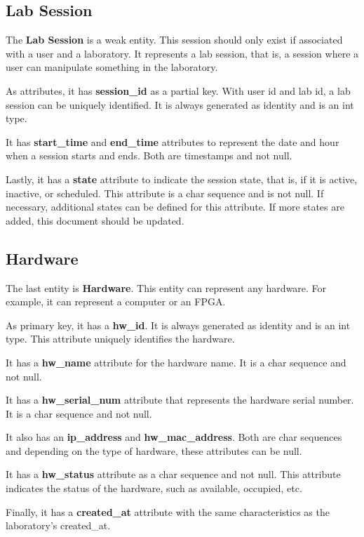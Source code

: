 \documentclass[a4paper,twoside,11pt]{article}
\begin{document}
\subsection*{Lab Session}
The \textbf{Lab Session} is a weak entity. This session should only exist if associated with a user and a laboratory. It represents a lab session, that is, a session where a user can manipulate something in the laboratory.

As attributes, it has \textbf{session\_id} as a partial key. With user id and lab id, a lab session can be uniquely identified. It is always generated as identity and is an int type.

It has \textbf{start\_time} and \textbf{end\_time} attributes to represent the date and hour when a session starts and ends. Both are timestamps and not null.

Lastly, it has a \textbf{state} attribute to indicate the session state, that is, if it is active, inactive, or scheduled. This attribute is a char sequence and is not null. If necessary, additional states can be defined for this attribute. If more states are added, this document should be updated.

\subsection*{Hardware}
The last entity is \textbf{Hardware}. This entity can represent any hardware. For example, it can represent a computer or an FPGA.

As primary key, it has a \textbf{hw\_id}. It is always generated as identity and is an int type. This attribute uniquely identifies the hardware.

It has a \textbf{hw\_name} attribute for the hardware name. It is a char sequence and not null. 

It has a \textbf{hw\_serial\_num} attribute that represents the hardware serial number. It is a char sequence and not null. 

It also has an \textbf{ip\_address} and \textbf{hw\_mac\_address}. Both are char sequences and depending on the type of hardware, these attributes can be null.

It has a \textbf{hw\_status} attribute as a char sequence and not null. This attribute indicates the status of the hardware, such as available, occupied, etc.

Finally, it has a \textbf{created\_at} attribute with the same characteristics as the laboratory's created\_at.
\end{document}
